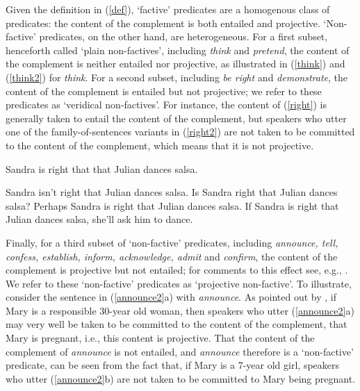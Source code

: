 \documentclass[11pt,fleqn]{article}
\newcommand{\6}{\mbox{$[\hspace*{-.6mm}[$}}
\newcommand{\9}{\mbox{$]\hspace*{-.6mm}]$}}
\begin{document}
Given the definition in (\ref{def}), `factive' predicates are a homogenous class of predicates: the content of the complement is both entailed and projective. `Non-factive' predicates, on the other hand, are heterogeneous. For a first subset, henceforth called `plain non-factives', including {\em think} and {\em pretend}, the content of the complement is neither entailed nor projective, as illustrated in (\ref{think}) and (\ref{think2}) for {\em think}. For a second subset, including {\em be right} and {\em demonstrate}, the content of the complement is entailed but not projective; we refer to these predicates as `veridical non-factives'. For instance, the content of (\ref{right}) is generally taken to entail the content of the complement, but speakers who utter one of the family-of-sentences variants in (\ref{right2}) are not taken to be committed to the content of the complement, which means that it is not projective. 

\begin{exe}
\ex\label{right} Sandra is right that that Julian dances salsa.
\ex\label{right2} 

\begin{xlist} 
\ex Sandra isn't right that Julian dances salsa. 
\ex Is Sandra right that Julian dances salsa?
\ex Perhaps Sandra is right that Julian dances salsa.
\ex If Sandra is right that Julian dances salsa, she'll ask him to dance. 
\end{xlist}
\end{exe}
Finally, for a third subset of `non-factive' predicates, including {\em announce, tell, confess, establish, inform, acknowledge, admit} and {\em confirm}, the content of the complement is projective but not entailed; for comments to this effect see, e.g., \citealt{reis1973,melvold1991,schultz2003,swanson2012,anand-hacquard2014,spector-egre2015,karttunen2016,tbd-variability}.  We refer to these `non-factive' predicates as `projective non-factive'. To illustrate, consider the sentence in (\ref{announce2}a) with {\em announce}. As pointed out by \citet[139]{schlenker10}, if Mary is a responsible 30-year old woman, then speakers who utter (\ref{announce2}a) may very well be taken to be committed to the content of the complement, that Mary is pregnant, i.e., this content is projective. That the content of the complement of {\em announce} is not entailed, and {\em announce} therefore is a `non-factive' predicate, can be seen from the fact that, if Mary is a 7-year old girl, speakers who utter (\ref{announce2}b)  are not taken to be committed to Mary being pregnant. 
\end{document}
